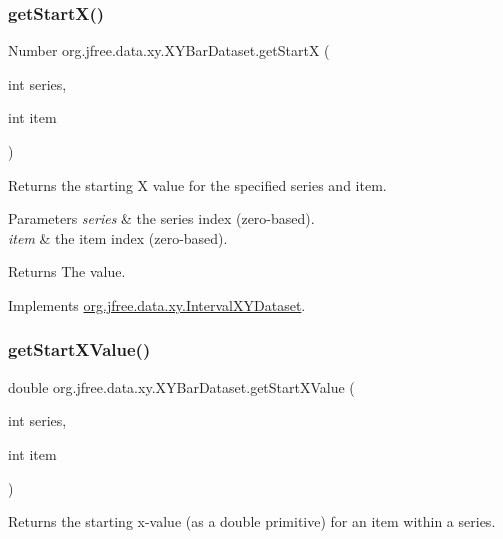 \subsubsection{\texorpdfstring{get\+Start\+X()}{getStartX()}}
{\footnotesize\ttfamily Number org.\+jfree.\+data.\+xy.\+X\+Y\+Bar\+Dataset.\+get\+StartX (\begin{DoxyParamCaption}\item[{int}]{series,  }\item[{int}]{item }\end{DoxyParamCaption})}

Returns the starting X value for the specified series and item.


\begin{DoxyParams}{Parameters}
{\em series} & the series index (zero-\/based). \\
\hline
{\em item} & the item index (zero-\/based).\\
\hline
\end{DoxyParams}
\begin{DoxyReturn}{Returns}
The value. 
\end{DoxyReturn}


Implements \mbox{\hyperlink{interfaceorg_1_1jfree_1_1data_1_1xy_1_1_interval_x_y_dataset_a7548ec7d60d72463313dc6f10aceee62}{org.\+jfree.\+data.\+xy.\+Interval\+X\+Y\+Dataset}}.

\mbox{\label{classorg_1_1jfree_1_1data_1_1xy_1_1_x_y_bar_dataset_aa9cfc4276ea7952e5907d0584ff541c4}} 
\subsubsection{\texorpdfstring{get\+Start\+X\+Value()}{getStartXValue()}}
{\footnotesize\ttfamily double org.\+jfree.\+data.\+xy.\+X\+Y\+Bar\+Dataset.\+get\+Start\+X\+Value (\begin{DoxyParamCaption}\item[{int}]{series,  }\item[{int}]{item }\end{DoxyParamCaption})}

Returns the starting x-\/value (as a double primitive) for an item within a series.


